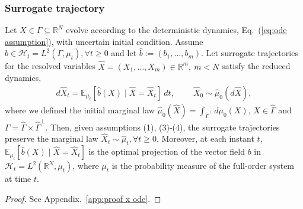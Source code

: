 \documentclass[11pt, a4paper, oneside, reqno]{amsart}
\begin{document}
\subsubsection{Surrogate trajectory}
\begin{proposition}\label{prop:deterministic}
Let $X\in\Gamma\subseteq\mathbb{R}^N$ evolve according to the deterministic dynamics, Eq.~(\ref{eq:ode assumption}), with uncertain initial condition. Assume $b\in \mathcal{H}_t=L^2(\Gamma,\mu_t), \forall t \geq 0$ and let $\hat{b}:=(b_1,\dots,b_m)$. Let surrogate trajectories for the resolved variables $\hat{X}=(X_1,\dots,X_m)\in\mathbb{R}^m, \ m<N$ satisfy the reduced dynamics,
\begin{eqnarray}\label{eq:surrogate dynamics proposition}
    d\hat{X}_t = \mathbb{E}_{\mu_t}[\hat{b}(X)\mid\hat{X} = \hat{X}_t] \ dt, \ \qquad
    \hat{X}_0 \sim \hat{\mu}_0(d\hat{X}),
\end{eqnarray}
where we defined the initial marginal law $\hat{\mu}_0(\hat{X})=\int_{\hat{\Gamma}^\perp}d\mu_0(X)$, $\hat{X}\in\hat{\Gamma}$ and $\Gamma=\hat{\Gamma}\times\hat{\Gamma}^\perp$.
Then, given assumptions (1), (3)-(4), the surrogate trajectories preserve the marginal law $\hat{X}_t\sim\hat{\mu}_t, \forall t\geq 0$. 
Moreover, at each instant $t$, $\mathbb{E}_{\mu_t}[\hat{b}(X)\mid\hat{X} = \hat{X}_t]$ is the optimal projection of the vector field $b$ in $\mathcal{H}_t=L^2(\mathbb{R}^N,\mu_t)$, where $\mu_t$ is the probability measure of the full-order system at time $t$. 
\end{proposition}
\begin{proof}
    See Appendix.~\ref{app:proof x ode}.
\end{proof}
\end{document}
